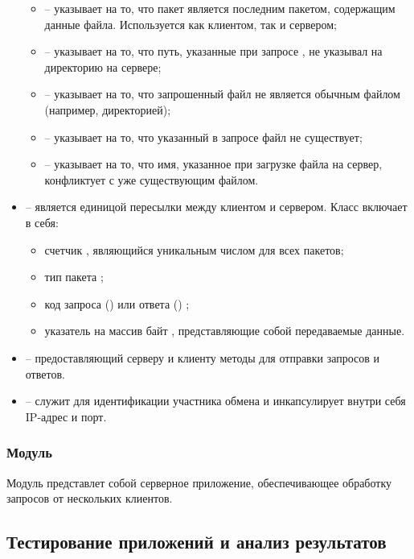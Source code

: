 \begin{itemize}
\begin{itemize}
			\item {} -- указывает на то, что пакет является последним пакетом, содержащим данные файла. Используется как клиентом, так и сервером;
			\item {} -- указывает на то, что путь, указанные при запросе , не указывал на директорию на сервере;
			\item {} -- указывает на то, что запрошенный файл не является обычным файлом (например, директорией);
			\item {} -- указывает на то, что указанный в запросе файл не существует;
			\item {} -- указывает на то, что имя, указанное при загрузке файла на сервер, конфликтует с уже существующим файлом.
		\end{itemize}
	\item {} -- является единицой пересылки между клиентом и сервером. Класс включает в себя:
		\begin{itemize}
			\item счетчик , являющийся уникальным числом для всех пакетов;
			\item тип пакета ;
			\item код запроса () или ответа () ;
			\item указатель на массив байт , представляющие собой передаваемые данные.
		\end{itemize}
	\item {} -- предоставляющий серверу и клиенту методы для отправки запросов и ответов.
	\item {} -- служит для идентификации участника обмена и инкапсулирует внутри себя IP-адрес и порт. 
\end{itemize}

\subsubsection{Модуль }

Модуль  представлет собой серверное приложение, обеспечивающее обработку запросов от нескольких клиентов. 

\subsection{Тестирование приложений и анализ результатов}

